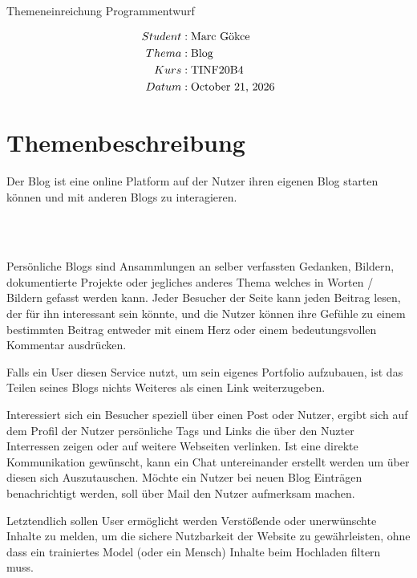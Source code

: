 \documentclass[11pt]{article}
\begin{document}
{\huge Themeneinreichung Programmentwurf}

    \begin{align*}
        Student &: \text{Marc Gökce}\notag\\
        Thema&: \text{Blog}\notag\\
        Kurs&: \text{TINF20B4}\notag\\
        Datum&: \text{\today}\notag
    \end{align*}


    \section{Themenbeschreibung}\label{sec:themenbeschreibung}

    Der Blog ist eine online Platform auf der Nutzer ihren eigenen Blog starten k\"onnen und mit anderen Blogs zu interagieren.

    \\~

    Pers\"onliche Blogs sind Ansammlungen an selber verfassten Gedanken, Bildern, dokumentierte Projekte oder jegliches anderes Thema welches in Worten / Bildern gefasst werden kann.
    Jeder Besucher der Seite kann jeden Beitrag lesen, der f\"ur ihn interessant sein k\"onnte, und die Nutzer k\"onnen ihre Gef\"uhle zu einem bestimmten Beitrag entweder mit einem Herz oder einem bedeutungsvollen Kommentar ausdr\"ucken.

    Falls ein User diesen Service nutzt, um sein eigenes Portfolio aufzubauen, ist das Teilen seines Blogs nichts Weiteres als einen Link weiterzugeben.

    Interessiert sich ein Besucher speziell \"uber einen Post oder Nutzer, ergibt sich auf dem Profil der Nutzer pers\"onliche Tags und Links die \"uber den Nuzter Interressen zeigen oder auf weitere Webseiten verlinken.
    Ist eine direkte Kommunikation gew\"unscht, kann ein Chat untereinander erstellt werden um \"uber diesen sich Auszutauschen.
    M\"ochte ein Nutzer bei neuen Blog Eintr\"agen benachrichtigt werden, soll \"uber Mail den Nutzer aufmerksam machen.

    Letztendlich sollen User erm\"oglicht werden Verst\"oßende oder unerw\"unschte Inhalte zu melden, um die sichere Nutzbarkeit der Website zu gew\"ahrleisten, ohne dass ein trainiertes Model (oder ein Mensch) Inhalte beim Hochladen filtern muss.

    \cleardoublepage
\end{document}
